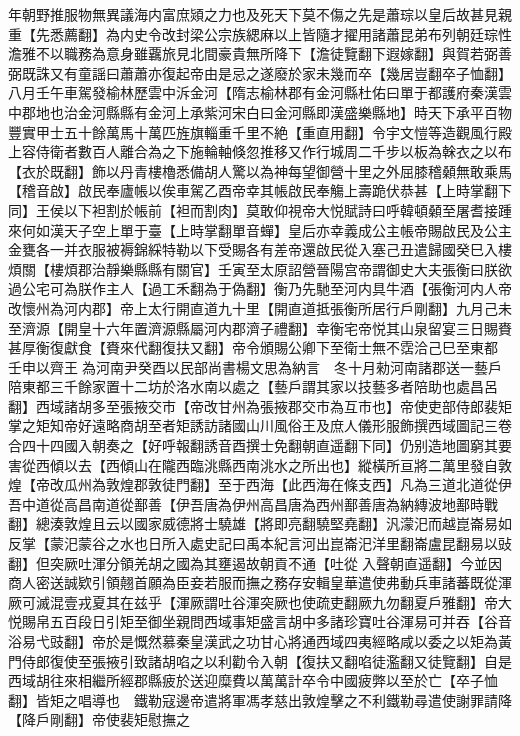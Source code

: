 年朝野推服物無異議海内富庶熲之力也及死天下莫不傷之先是蕭琮以皇后故甚見親重【先悉薦翻】為内史令改封梁公宗族緦麻以上皆隨才擢用諸蕭昆弟布列朝廷琮性澹雅不以職務為意身雖覊旅見北間豪貴無所降下【澹徒覽翻下遐嫁翻】與賀若弼善弼既誅又有童謡曰蕭蕭亦復起帝由是忌之遂廢於家未幾而卒【幾居豈翻卒子恤翻】　八月壬午車駕發榆林歷雲中泝金河【隋志榆林郡有金河縣杜佑曰單于都護府秦漢雲中郡地也治金河縣縣有金河上承紫河宋白曰金河縣即漢盛樂縣地】時天下承平百物豐實甲士五十餘萬馬十萬匹旌旗輜重千里不絶【重直用翻】令宇文愷等造觀風行殿上容侍衛者數百人離合為之下施輪軸倏忽推移又作行城周二千步以板為榦衣之以布【衣於既翻】飾以丹青樓櫓悉備胡人驚以為神每望御營十里之外屈膝稽顙無敢乘馬【稽音啟】啟民奉廬帳以俟車駕乙酉帝幸其帳啟民奉觴上壽跪伏恭甚【上時掌翻下同】王侯以下袒割於帳前【袒而割肉】莫敢仰視帝大悦賦詩曰呼韓頓顙至屠耆接踵來何如漢天子空上單于臺【上時掌翻單音蟬】皇后亦幸義成公主帳帝賜啟民及公主金甕各一并衣服被褥錦綵特勒以下受賜各有差帝還啟民從入塞己丑遣歸國癸巳入樓煩關【樓煩郡治靜樂縣縣有關官】壬寅至太原詔營晉陽宫帝謂御史大夫張衡曰朕欲過公宅可為朕作主人【過工禾翻為于偽翻】衡乃先馳至河内具牛酒【張衡河内人帝改懷州為河内郡】帝上太行開直道九十里【開直道抵張衡所居行戶剛翻】九月己未至濟源【開皇十六年置濟源縣屬河内郡濟子禮翻】幸衡宅帝悦其山泉留宴三日賜賚甚厚衡復獻食【賚來代翻復扶又翻】帝令頒賜公卿下至衛士無不霑洽己巳至東都　壬申以齊王為河南尹癸酉以民部尚書楊文思為納言　冬十月勑河南諸郡送一藝戶陪東都三千餘家置十二坊於洛水南以處之【藝戶謂其家以技藝多者陪助也處昌呂翻】西域諸胡多至張掖交市【帝改甘州為張掖郡交市為互市也】帝使吏部侍郎裴矩掌之矩知帝好遠略商胡至者矩誘訪諸國山川風俗王及庶人儀形服飾撰西域圖記三卷合四十四國入朝奏之【好呼報翻誘音酉撰士免翻朝直遥翻下同】仍别造地圖窮其要害從西傾以去【西傾山在隴西臨洮縣西南洮水之所出也】縱橫所亘將二萬里發自敦煌【帝改瓜州為敦煌郡敦徒門翻】至于西海【此西海在條支西】凡為三道北道從伊吾中道從高昌南道從鄯善【伊吾唐為伊州高昌唐為西州鄯善唐為納縳波地鄯時戰翻】總湊敦煌且云以國家威德將士驍雄【將即亮翻驍堅堯翻】汎濛汜而越崑崙易如反掌【蒙汜蒙谷之水也日所入處史記曰禹本紀言河出崑崙汜洋里翻崙盧昆翻易以䜴翻】但突厥吐渾分領羌胡之國為其壅遏故朝貢不通【吐從入聲朝直遥翻】今並因商人密送誠欵引領翹首願為臣妾若服而撫之務存安輯皇華遣使弗動兵車諸蕃既從渾厥可滅混壹戎夏其在兹乎【渾厥謂吐谷渾突厥也使疏吏翻厥九勿翻夏戶雅翻】帝大悦賜帛五百段日引矩至御坐親問西域事矩盛言胡中多諸珍寶吐谷渾易可并吞【谷音浴易弋豉翻】帝於是慨然慕秦皇漢武之功甘心將通西域四夷經略咸以委之以矩為黃門侍郎復使至張掖引致諸胡啗之以利勸令入朝【復扶又翻啗徒濫翻又徒覽翻】自是西域胡往來相繼所經郡縣疲於送迎糜費以萬萬計卒令中國疲弊以至於亡【卒子恤翻】皆矩之唱導也　鐵勒寇邊帝遣將軍馮孝慈出敦煌擊之不利鐵勒尋遣使謝罪請降【降戶剛翻】帝使裴矩慰撫之


